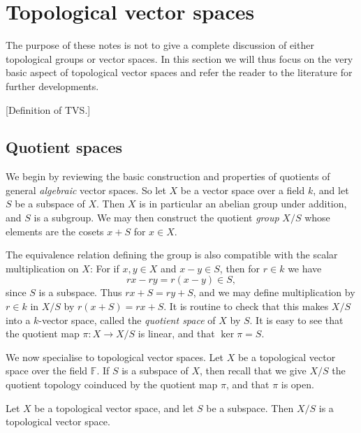 \documentclass[article, a4paper, 11pt, oneside]{memoir}
\numberwithin{equation}{chapter}
\begin{document}
\chapter{Topological vector spaces}

The purpose of these notes is not to give a complete discussion of either topological groups or vector spaces. In this section we will thus focus on the very basic aspect of topological vector spaces and refer the reader to the literature for further developments.

[Definition of TVS.]

\section{Quotient spaces}

We begin by reviewing the basic construction and properties of quotients of general \emph{algebraic} vector spaces. So let $X$ be a vector space over a field $k$, and let $S$ be a subspace of $X$. Then $X$ is in particular an abelian group under addition, and $S$ is a subgroup. We may then construct the quotient \emph{group} $X/S$ whose elements are the cosets $x + S$ for $x \in X$.

The equivalence relation defining the group is also compatible with the scalar multiplication on $X$: For if $x,y \in X$ and $x - y \in S$, then for $r \in k$ we have
%
\begin{equation*}
    rx - ry
        = r(x - y) \in S,
\end{equation*}
%
since $S$ is a subspace. Thus $rx + S = ry + S$, and we may define multiplication by $r \in k$ in $X/S$ by $r(x + S) = rx + S$. It is routine to check that this makes $X/S$ into a $k$-vector space, called the \emph{quotient space} of $X$ by $S$. It is easy to see that the quotient map $\pi \colon X \to X/S$ is linear, and that $\ker \pi = S$.

\newcommand{\setF}{\mathbb{F}}

We now specialise to topological vector spaces. Let $X$ be a topological vector space over the field $\setF$. If $S$ is a subspace of $X$, then recall that we give $X/S$ the quotient topology coinduced by the quotient map $\pi$, and that $\pi$ is open.


\begin{theorem}
    Let $X$ be a topological vector space, and let $S$ be a subspace. Then $X/S$ is a topological vector space.
\end{theorem}
\end{document}
